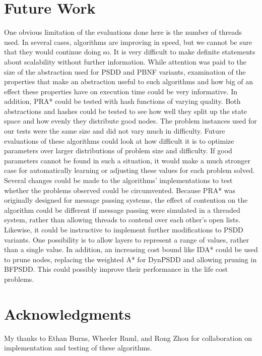 \documentclass{article}
\begin{document}
\section{Future Work}
One obvious limitation of the evaluations done here is the number of threads used. In several cases, algorithms are improving in speed, but we cannot be sure that they would continue doing so. It is very difficult to make definite statements about scalability without further information.
While attention was paid to the size of the abstraction used for PSDD and PBNF variants, examination of the properties that make an abstraction useful to such algorithms and how big of an effect these properties have on execution time could be very informative. In addition, PRA* could be tested with hash functions of varying quality. Both abstractions and hashes could be tested to see how well they split up the state space and how evenly they distribute good nodes.
The problem instances used for our tests were the same size and did not vary much in difficulty. Future evaluations of these algorithms could look at how difficult it is to optimize parameters over larger distributions of problem size and difficulty. If good parameters cannot be found in such a situation, it would make a much stronger case for automatically learning or adjusting these values for each problem solved.
Several changes could be made to the algorithms' implementations to test whether the problems observed could be circumvented. Because PRA* was originally designed for message passing systems, the effect of contention on the algorithm could be different if message passing were simulated in a threaded system, rather than allowing threads to contend over each other's open lists. Likewise, it could be instructive to implement further modifications to PSDD variants. One possibility is to allow layers to represent a range of values, rather than a single value. In addition, an increasing cost bound like IDA* could be used to prune nodes, replacing the weighted A* for DynPSDD and allowing pruning in BFPSDD. This could possibly improve their performance in the life cost problems.
\section{Acknowledgments}
My thanks to Ethan Burns, Wheeler Ruml, and Rong Zhou for collaboration on implementation and testing of these algorithms.



\end{document}
